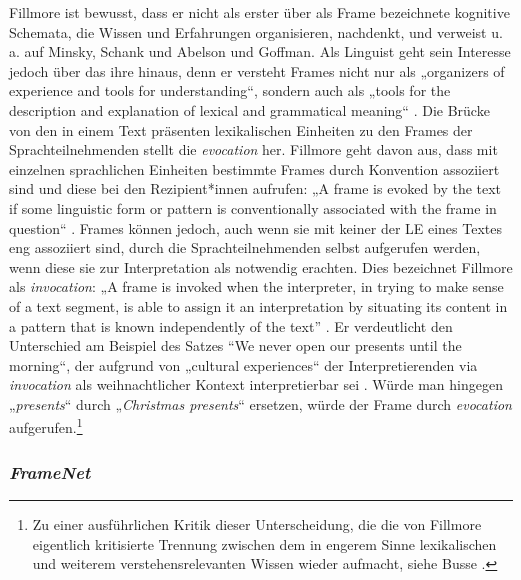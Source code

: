 Fillmore ist bewusst, dass er nicht als erster über als Frame bezeichnete kognitive Schemata, die Wissen und Erfahrungen organisieren, nachdenkt, und verweist u.\,a. auf Minsky, Schank und Abelson und Goffman. Als Linguist geht sein Interesse jedoch über das ihre hinaus, denn er versteht Frames nicht nur als „organizers of experience and tools for understanding``, sondern auch als „tools for the description and explanation of lexical and grammatical meaning`` \autocite[232]{fillmoreFramesSemanticsUnderstanding1985}. Die Brücke von den in einem Text präsenten lexikalischen Einheiten zu den Frames der Sprachteilnehmenden stellt die \emph{evocation} her. Fillmore geht davon aus, dass mit einzelnen sprachlichen Einheiten bestimmte Frames durch Konvention assoziiert sind und diese bei den Rezipient*innen aufrufen: „A frame is evoked by the text if some linguistic form or pattern is conventionally associated with the frame in question`` \autocite*[232]{fillmoreFramesSemanticsUnderstanding1985}. Frames können jedoch, auch wenn sie mit keiner der LE eines Textes eng assoziiert sind, durch die Sprachteilnehmenden selbst aufgerufen werden, wenn diese sie zur Interpretation als notwendig erachten. Dies bezeichnet Fillmore als \emph{invocation}: „A frame is invoked when the interpreter, in trying to make sense of a text segment, is able to assign it an interpretation by situating its content in a pattern that is known independently of the text'' \autocite*[232]{fillmoreFramesSemanticsUnderstanding1985}. Er verdeutlicht den Unterschied am Beispiel des Satzes ``We never open our presents until the morning``, der aufgrund von „cultural experiences`` der Interpretierenden via \emph{invocation} als weihnachtlicher Kontext interpretierbar sei \autocite[232]{fillmoreFramesSemanticsUnderstanding1985}. Würde man hingegen „\emph{presents}`` durch „\emph{Christmas presents}`` ersetzen, würde der Frame durch \emph{evocation} aufgerufen.\footnote{Zu einer ausführlichen Kritik dieser Unterscheidung, die die von Fillmore eigentlich kritisierte Trennung zwischen dem in engerem Sinne lexikalischen und weiterem verstehensrelevanten Wissen wieder aufmacht, siehe Busse \autocite*[207, 667-670]{busseFrameSemantikKompendium2012}.}

\subsubsection{\texorpdfstring{\emph{FrameNet}}{FrameNet}}\label{framenet}

